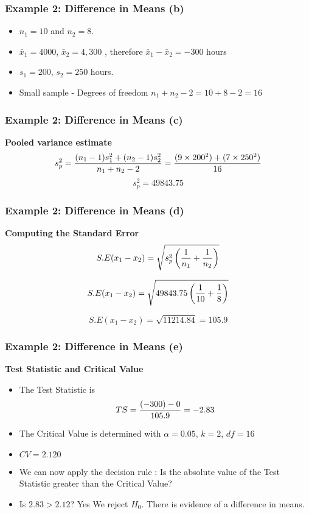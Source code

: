 \documentclass[a4]{beamer}
\begin{document}

\begin{frame}
\frametitle{Example 2: Difference in Means (b) }
\begin{itemize}\item $n_1 = 10$ and $n_2 = 8$.
\item $\bar{x}_1 = 4000$, $\bar{x}_2 = 4,300 $ , therefore  $\bar{x}_1 - \bar{x}_2 = -300$ hours
\item $s_1  = 200$, $s_2 = 250$ hours.
\item Small sample - Degrees of freedom $n_1 + n_2 - 2 = 10 + 8 - 2 = 16$
\end{itemize}\end{frame}
\begin{frame}
\frametitle{Example 2: Difference in Means (c) }
\textbf{Pooled variance estimate}
\[ s^2_p = {(n_1 - 1)s^2_1  + (n_2 - 1)s^2_ 2\over n_1 + n_2 - 2 } = {(9 \times 200^2 ) +( 7 \times 250^2) \over 16 }  \]
\[ s^2_p  = 49843.75 \]
\end{frame}

\begin{frame}
\frametitle{Example 2: Difference in Means (d) }
\textbf{Computing the Standard Error}
\[ S.E(x_1 - x_2) = \sqrt{s^2_p \left({1\over n_1}+{1\over n_2} \right)}\]

\[ S.E(x_1 - x_2) = \sqrt{49843.75 \left({1\over 10}+{1\over 8} \right)}\]

\[ S.E(x_1 - x_2) = \sqrt{11214.84} = 105.9\]

\end{frame}

\begin{frame}
\frametitle{Example 2: Difference in Means (e) }
\textbf{Test Statistic and Critical Value}\\
\begin{itemize}
\item The Test Statistic is \[ TS  = {(-300) - 0 \over 105.9}  = -2.83 \]
\item The Critical Value is determined with $\alpha = 0.05$, $k=2$, $df = 16 $
\item $CV = 2.120$
\item We can now apply the decision rule : Is the absolute value of the Test Statistic greater than the Critical Value?
\item Is $2.83 > 2.12$? Yes We reject $H_0$. There is evidence of a difference in means.
\end{itemize}
\end{frame}
\end{document}
